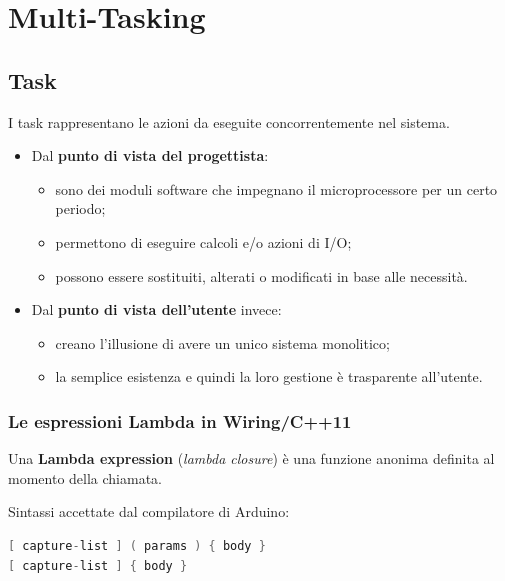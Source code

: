 \chapter{Multi-Tasking}

\section{Task}
I task rappresentano le azioni da eseguite concorrentemente nel sistema. 

\begin{itemize}
	\item Dal \textbf{punto di vista del progettista}:
	\begin{itemize}
		\item sono dei moduli software che impegnano il microprocessore per un certo periodo;
		\item permettono di eseguire calcoli e/o azioni di I/O;
		\item possono essere sostituiti, alterati o modificati in base alle necessità.
	\end{itemize}
	\item Dal \textbf{punto di vista dell'utente} invece:
	\begin{itemize}
		\item  creano l'illusione di avere un unico sistema monolitico;
		\item  la semplice esistenza e quindi la loro gestione è trasparente all'utente.
	\end{itemize}
\end{itemize}


\subsection{Le espressioni Lambda in Wiring/C++11}
Una \textbf{Lambda expression} (\textit{lambda closure}) è una funzione anonima definita al momento della chiamata. 

Sintassi accettate dal compilatore di Arduino:
\begin{lstlisting}[language=C++]
[ capture-list ] ( params ) { body }
[ capture-list ] { body } 
\end{lstlisting}


